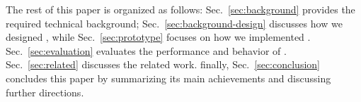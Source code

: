 
The rest of this paper is organized as follows: Sec.~\ref{sec:background}
provides the required technical background; Sec.~\ref{sec:background-design}
discusses how we designed \tcpls, while Sec.~\ref{sec:prototype} focuses on
how we implemented \tcpls. Sec.~\ref{sec:evaluation} evaluates the performance
and behavior of \tcpls. Sec.~\ref{sec:related} discusses the related work.
finally, Sec.~\ref{sec:conclusion} concludes this paper by
summarizing its main achievements and discussing further directions.
